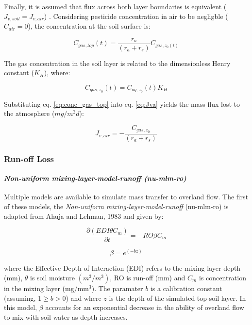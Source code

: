 \documentclass[]{article}
\let\oldparagraph\paragraph
\renewcommand{\paragraph}[1]{\oldparagraph{#1}\mbox{}}
\begin{document}
Finally, it is assumed that flux across both layer boundaries is
equivalent (\(J_{v,soil} = J_{v,air}\)) \citep{Leistra2001}. Considering
pesticide concentration in air to be negligble (\(C_{air} = 0\)), the
concentration at the soil surface is:

\begin{equation}
C_{gas,top}(t) = \frac{r_a}{(r_a + r_s)} C_{gas,z_{0}(t)}
\label{eq:conc_gas_top}
\end{equation}

The gas concentration in the soil layer is related to the dimensionless
Henry constant (\(K_H\)), where:

\begin{equation}
C_{gas,z_0}(t) = C_{aq,z_0}(t) K_H  
\label{eq:henry}
\end{equation}

Substituting eq. \ref{eq:conc_gas_top} into eq. \ref{eq:Jva} yields the
mass flux lost to the atmosphere (\(mg/m^2d\)):

\begin{equation}
J_{v,air} = - \frac{C_{gas,z_0}}{(r_a + r_s)}
\label{eq:Jva_final}
\end{equation}

\hypertarget{run-off-loss}{%
\subsubsection{Run-off Loss}\label{run-off-loss}}

\hypertarget{section}{%
\paragraph{\texorpdfstring{\textit{Non-uniform mixing-layer-model-runoff (nu-mlm-ro)}}{}}\label{section}}

Multiple models are available to simulate mass transfer to overland
flow. The first of these models, the
\textit{Non-uniform mixing-layer-model-runoff} (nu-mlm-ro) is adapted
from Ahuja and Lehman, 1983 \citep[see][eq. 1 and p.~1217]{Shi2011} and
given by:

\begin{equation}
\frac{\partial (EDI \theta C_m)}{\partial t} = -RO \beta C_m
\label{eq:nu-mlm-ro}
\end{equation}

\begin{equation}
\beta = e^{(-bz)}
\label{eq:beta-nu-mlm}
\end{equation}

where the Effective Depth of Interaction (EDI) refers to the mixing
layer depth (mm), \(\theta\) is soil moisture \((m^3/m^3)\), RO is
run-off (mm) and \(C_m\) is concentration in the mixing layer
(mg/mm\(^3\)). The paramater \(b\) is a calibration constant (assuming,
\(1 \ge b > 0\)) and where \(z\) is the depth of the simulated top-soil
layer. In this model, \(\beta\) accounts for an exponential decrease in
the ability of overland flow to mix with soil water as depth increases.
\end{document}

